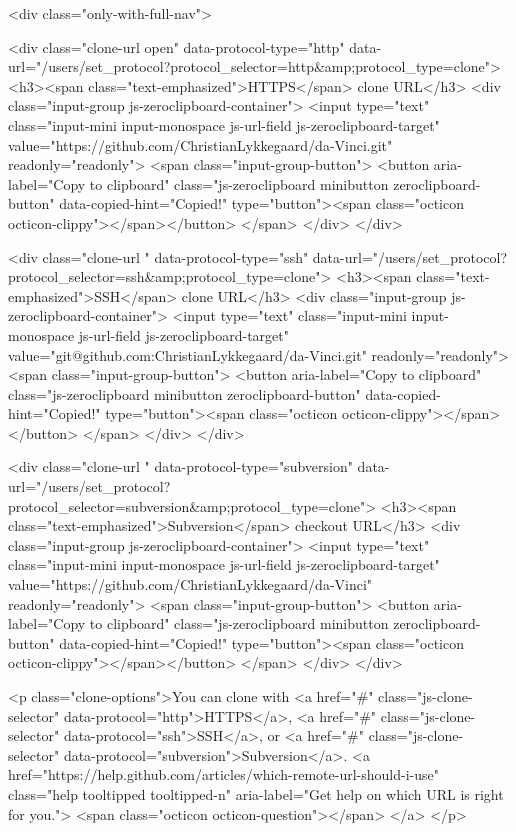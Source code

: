               <div class="only-with-full-nav">
                  
<div class="clone-url open"
  data-protocol-type="http"
  data-url="/users/set_protocol?protocol_selector=http&amp;protocol_type=clone">
  <h3><span class="text-emphasized">HTTPS</span> clone URL</h3>
  <div class="input-group js-zeroclipboard-container">
    <input type="text" class="input-mini input-monospace js-url-field js-zeroclipboard-target"
           value="https://github.com/ChristianLykkegaard/da-Vinci.git" readonly="readonly">
    <span class="input-group-button">
      <button aria-label="Copy to clipboard" class="js-zeroclipboard minibutton zeroclipboard-button" data-copied-hint="Copied!" type="button"><span class="octicon octicon-clippy"></span></button>
    </span>
  </div>
</div>

  
<div class="clone-url "
  data-protocol-type="ssh"
  data-url="/users/set_protocol?protocol_selector=ssh&amp;protocol_type=clone">
  <h3><span class="text-emphasized">SSH</span> clone URL</h3>
  <div class="input-group js-zeroclipboard-container">
    <input type="text" class="input-mini input-monospace js-url-field js-zeroclipboard-target"
           value="git@github.com:ChristianLykkegaard/da-Vinci.git" readonly="readonly">
    <span class="input-group-button">
      <button aria-label="Copy to clipboard" class="js-zeroclipboard minibutton zeroclipboard-button" data-copied-hint="Copied!" type="button"><span class="octicon octicon-clippy"></span></button>
    </span>
  </div>
</div>

  
<div class="clone-url "
  data-protocol-type="subversion"
  data-url="/users/set_protocol?protocol_selector=subversion&amp;protocol_type=clone">
  <h3><span class="text-emphasized">Subversion</span> checkout URL</h3>
  <div class="input-group js-zeroclipboard-container">
    <input type="text" class="input-mini input-monospace js-url-field js-zeroclipboard-target"
           value="https://github.com/ChristianLykkegaard/da-Vinci" readonly="readonly">
    <span class="input-group-button">
      <button aria-label="Copy to clipboard" class="js-zeroclipboard minibutton zeroclipboard-button" data-copied-hint="Copied!" type="button"><span class="octicon octicon-clippy"></span></button>
    </span>
  </div>
</div>



<p class="clone-options">You can clone with
  <a href="#" class="js-clone-selector" data-protocol="http">HTTPS</a>, <a href="#" class="js-clone-selector" data-protocol="ssh">SSH</a>, or <a href="#" class="js-clone-selector" data-protocol="subversion">Subversion</a>.
  <a href="https://help.github.com/articles/which-remote-url-should-i-use" class="help tooltipped tooltipped-n" aria-label="Get help on which URL is right for you.">
    <span class="octicon octicon-question"></span>
  </a>
</p>



